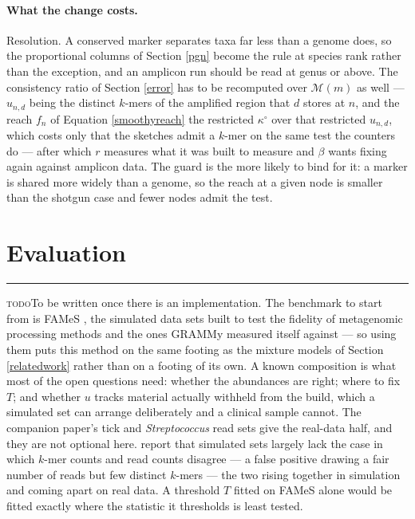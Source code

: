 \documentclass[pdflatex,sn-vancouver-num]{sn-jnl}
\newif\ifshowtodos \showtodostrue
\newcommand{\todo}[1]{%
  \ifshowtodos
    \par\addvspace{0.7\baselineskip}%
    \begin{list}{}{%
      \setlength{\leftmargin}{1.5em}%
      \setlength{\rightmargin}{1.5em}%
      \setlength{\topsep}{0pt}%
      \setlength{\partopsep}{0pt}%
      \setlength{\parsep}{0.5\baselineskip}%
      \setlength{\itemsep}{0pt}%
    }%
    \item[]\footnotesize\color{black!70}%
      \textcolor{orange!65!black}{\rule[-0.2ex]{2pt}{1.15ex}}\hspace{0.55em}%
      \textcolor{orange!65!black}{\textsc{todo}}\hspace{0.6em}\ignorespaces#1%
    \end{list}%
    \addvspace{0.7\baselineskip}%
  \fi%
}
\begin{document}
    \paragraph{What the change costs.} Resolution. A conserved marker separates taxa far less than a
    genome does, so the proportional columns of Section \ref{pgn} become the rule at species rank
    rather than the exception, and an amplicon run should be read at genus or above. The consistency
    ratio of Section \ref{error} has to be recomputed over $\mathcal{M}(m)$ as well --- $u_{n,d}$ being the
    distinct $k$-mers of the amplified region that $d$ stores at $n$, and the reach $f_n$ of
    Equation \eqref{smoothyreach} the restricted $\kappa^{\circ}$ over that restricted $u_{n,d}$,
    which costs only that the sketches admit a $k$-mer on the same test the counters do --- after
    which $r$ measures what it was built to measure and $\beta$ wants fixing again against amplicon
    data. The guard is the more likely to bind for it: a marker is shared more widely than a genome,
    so the reach at a given node is smaller than the shotgun case and fewer nodes admit the test.

    \section{Evaluation}\label{evaluation}
    \todo{To be written once there is an implementation. The benchmark to start from is FAMeS
    \citep{fames}, the simulated data sets built to test the fidelity of metagenomic processing
    methods and the ones GRAMMy measured itself against --- so using them puts this method on the
    same footing as the mixture models of Section \ref{relatedwork} rather than on a footing of its
    own. A known composition is what most of the open questions need: whether the abundances are
    right; where to fix $T$;
    and whether $u$ tracks material actually withheld from the build, which a simulated set can
    arrange deliberately and a clinical sample cannot. The companion paper's tick and
    \emph{Streptococcus} read sets give the real-data half, and they are not optional here.
    \citet{krakenuniq} report that simulated sets largely lack the case in which $k$-mer counts and
    read counts disagree --- a false positive drawing a fair number of reads but few distinct
    $k$-mers --- the two rising together in simulation and coming apart on real data. A threshold $T$
    fitted on FAMeS alone would be fitted exactly where the statistic it thresholds is least tested.}
\end{document}

